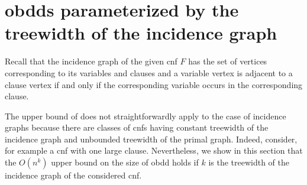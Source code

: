 \documentclass{article}
\begin{document}
\section{{\sc obdd}s parameterized by the treewidth of the incidence graph} \label{twinc}
Recall that the incidence graph of the given {\sc cnf} $F$ has the set of vertices
corresponding to its variables and clauses and a variable vertex is adjacent to a clause vertex if and 
only if the corresponding variable occurs in the corresponding clause. 
\begin{comment}
It is not hard to see that the treewidth of the incidence graph 
of the given {\sc cnf} $F$ is at most as the treewidth of the primal graph plus one. Indeed, for each clause $C$ of $F$, 
there is a clique in the primal graph of $F$. Hence any tree decomposition of this primal graph has a bag 
containing all the variables of $C$. Consequently, we just create a new leaf connected to the node of this bag 
and put into this leaf the clause $C$ and all its variables. The resulting structure is a tree decomposition
of the incidence graph of $F$ of width one more than the considered tree decomposition of the primal graph
of $F$. It immediately follows that the $n^{\Omega(k)}$ lower bound on the size of {\sc obdd} 
parameterized by the treewidth of the primal graph applies to the parameterization by the treewidth of the incidence graph.
\end{comment}
The upper bound of \cite{VardiTWD} does not straightforwardly apply to the 
case of incidence graphs because there are classes of {\sc cnf}s having constant treewidth of the 
incidence graph and unbounded treewidth of the primal graph. Indeed, consider, for example a {\sc cnf}
with one large clause. Nevertheless, we show in this section that the $O(n^k)$ upper bound on the
size of {\sc obdd} holds if $k$ is the treewidth of the incidence graph of the considered {\sc cnf}.
\begin{comment}
Thus, together with the upper bound of \cite{VardiTWD}, the results of this paper provide a 
\emph{complete classification} of the expressive power of {\sc obdd} for {\sc cnf}s of bounded
treewidth of the primal or incidence graph.
\end{comment}
\begin{comment}
The treewidth of incidence
graph is known to be a `stronger' parameter than the treewidth of the primal graph in the following
sense.  On the one hand, there are classes 
of {\sc cnf}s (e.g. containing one big clause) with a small treewidth of the incidence graph and 
an unbounded treewidth of the primal graph and, on the other hand, 
In this section, since there are {\sc cnf}s with an 
\end{comment}
\end{document}
